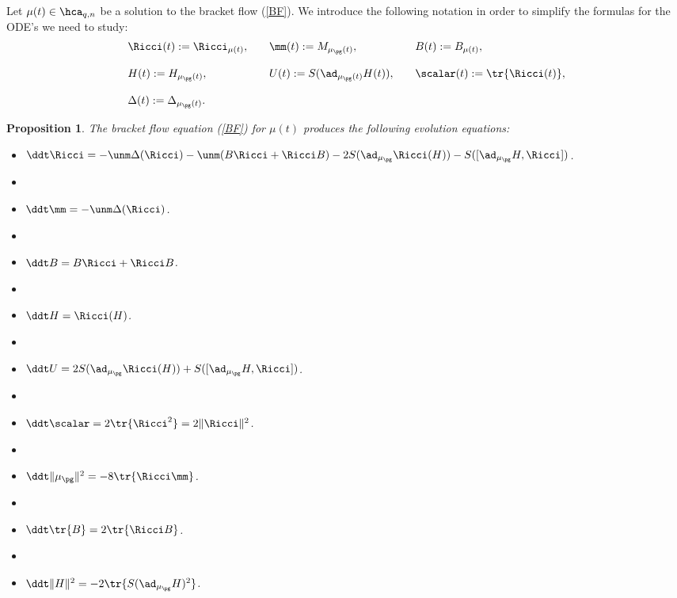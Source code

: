 \documentclass[11pt]{amsart}
\theoremstyle{plain}
\newtheorem{proposition}[theorem]{Proposition}
\theoremstyle{definition}
\theoremstyle{remark}
\begin{document}
Let $\mu(t)\in\hca_{q,n}$ be a solution to the bracket flow (\ref{BF}).  We introduce the following notation in
order to simplify the formulas for the ODE's we need to study:
\begin{equation}\label{not}
\begin{array}{lllll}
\Ricci(t):=\Ricci_{\mu(t)}, && \mm(t):=M_{\mu_{\pg}(t)}, && B(t):=B_{\mu(t)}, \\ \\
H(t):=H_{\mu_{\pg}(t)}, && U(t):=S(\ad_{\mu_{\pg}(t)}{H(t)}), &&
\scalar(t):=\tr{\Ricci(t)}, \\ \\
\Delta(t):=\Delta_{\mu_{\pg}(t)}. &&
\end{array}
\end{equation}


\begin{proposition}\label{eqs}
The bracket flow equation {\rm (\ref{BF})} for $\mu(t)$ produces the following evolution equations:
\begin{itemize}
\item[(i)] $\ddt\Ricci=-\unm\Delta(\Ricci)-\unm(B\Ricci+\Ricci B)- 2S(\ad_{\mu_{\pg}}{\Ricci(H)}) - S([\ad_{\mu_{\pg}}{H},\Ricci])$.
\item[ ]
\item[(ii)] $\ddt\mm=-\unm\Delta(\Ricci)$.
\item[ ]
\item[(iii)] $\ddt B=B\Ricci+\Ricci B$.
\item[ ]
\item[(iv)] $\ddt H=\Ricci(H)$.
\item[ ]
\item[(v)] $\ddt U= 2S(\ad_{\mu_{\pg}}{\Ricci(H)}) + S([\ad_{\mu_{\pg}}{H},\Ricci])$.
\item[ ]
\item[(vi)] $\ddt\scalar=2\tr{\Ricci^2}=2\|\Ricci\|^2$.
\item[ ]
\item[(vii)] $\ddt\|\mu_{\pg}\|^2=-8\tr{\Ricci\mm}$.
\item[ ]
\item[(viii)] $\ddt\tr{B}=2\tr{\Ricci B}$.
\item[ ]
\item[(ix)] $\ddt\| H\|^2=-2\tr{S(\ad_{\mu_{\pg}}{H})^2}$.
\end{itemize}

\end{proposition}
\end{document}
